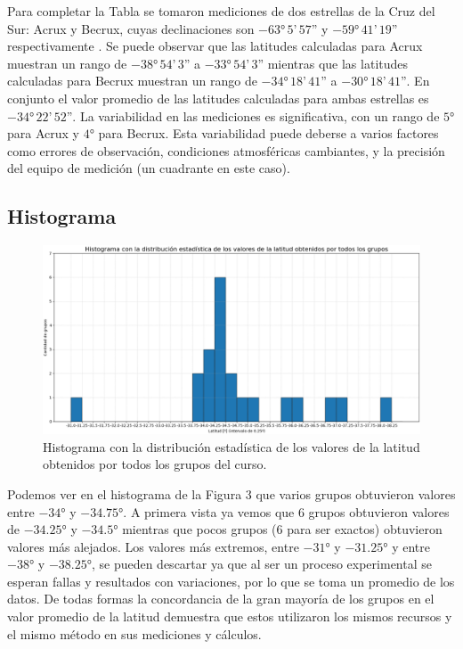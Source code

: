 \documentclass[12pt, a4paper]{article} %
\begin{document}
Para completar la Tabla se tomaron mediciones de dos estrellas de la Cruz del Sur: Acrux y Becrux, cuyas declinaciones son $-\ang{63} \,5\text{'}\, 57\text{''}$ y $-\ang{59} \, 41\text{'}\, 19\text{''}$ respectivamente \cite{buenosairesPlanetarioGalileo}. Se puede observar que las latitudes calculadas para Acrux muestran un rango de $-\ang{38} \,54\text{'}\, 3\text{''}$ a $-\ang{33} \,54\text{'}\, 3\text{''}$ mientras que las latitudes calculadas para Becrux muestran un rango de $-\ang{34} \,18\text{'}\, 41\text{''}$ a $-\ang{30} \,18\text{'}\, 41\text{''}$. En conjunto el valor promedio de las latitudes calculadas para ambas estrellas es $-\ang{34} \,22\text{'}\, 52\text{''}$. La variabilidad en las mediciones es significativa, con un rango de $\ang{5}$ para Acrux y $\ang{4}$ para Becrux. Esta variabilidad puede deberse a varios factores como errores de observación, condiciones atmosféricas cambiantes, y la precisión del equipo de medición (un cuadrante en este caso).

\subsection{Histograma}
\begin{figure}[H]
    \centering
    \includegraphics[width=15cm]{images/histograma.png}
    \caption{Histograma con la distribución estadística de los valores de la latitud obtenidos por todos los grupos del curso.}
    \label{fig:histograma}
\end{figure}

Podemos ver en el histograma de la Figura 3 que varios grupos obtuvieron valores entre $-\ang{34}$ y $-\ang{34.75}$. A primera vista ya vemos que 6 grupos obtuvieron valores de $-\ang{34.25}$ y $-\ang{34.5}$ mientras que pocos grupos (6 para ser exactos) obtuvieron valores más alejados. Los valores más extremos, entre $-\ang{31}$ y $-\ang{31.25}$ y entre $-\ang{38}$ y $-\ang{38.25}$, se pueden descartar ya que al ser un proceso experimental se esperan fallas y resultados con variaciones, por lo que se toma un promedio de los datos. De todas formas la concordancia de la gran mayoría de los grupos en el valor promedio de la latitud demuestra que estos utilizaron los mismos recursos y el mismo método en sus mediciones y cálculos. 
\end{document}
